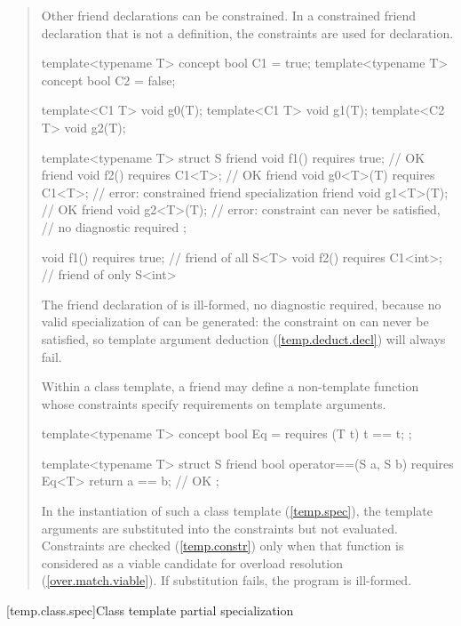 \begin{quote}
\begin{addedblock}
\pnum
\enternote
Other friend declarations can be constrained. In a constrained friend 
declaration that is not a definition, the constraints are used for declaration.
\exitnote
\enterexample
\begin{codeblock}
template<typename T> concept bool C1 = true;
template<typename T> concept bool C2 = false;

template<C1 T> void g0(T);
template<C1 T> void g1(T);
template<C2 T> void g2(T);

template<typename T>
  struct S {
    friend void f1() requires true;      // OK
    friend void f2() requires C1<T>;     // OK
    friend void g0<T>(T) requires C1<T>; // error: constrained friend specialization
    friend void g1<T>(T);                // OK
    friend void g2<T>(T);                // error: constraint can never be satisfied, 
                                         // no diagnostic required
  };

void f1() requires true;    // friend of all S<T>
void f2() requires C1<int>; // friend of only S<int>
\end{codeblock}
The friend declaration of  is ill-formed, no
diagnostic required, because no valid specialization of 
can be generated: the constraint on  can never
be satisfied, so template argument deduction
(\ref{temp.deduct.decl}) will always fail.
\exitexample

\pnum
\enternote
Within a class template, a friend may define a non-template function
whose constraints specify requirements on template arguments.
\enterexample
\begin{codeblock}
template<typename T> concept bool Eq = requires (T t) { t == t; };

template<typename T>
  struct S {
    friend bool operator==(S a, S b) requires Eq<T> { return a == b; } // OK
  };
\end{codeblock}
\exitexample
In the instantiation of such a class template (\ref{temp.spec}), the 
template arguments are substituted into the constraints but not evaluated.
Constraints are checked (\ref{temp.constr}) only when
that function is considered as a viable candidate for overload resolution
(\ref{over.match.viable}). If substitution fails, the program is ill-formed.
\exitnote
\end{addedblock}
\end{quote}


[temp.class.spec]{Class template partial specialization}

